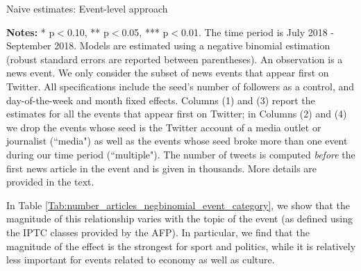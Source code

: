 \begin{table}
\caption{Naive estimates: Event-level approach}
\begin{center}
	
\end{center}
\begin{spacing}{0.5}
	{\fns \textbf{Notes:} * p$<$0.10, ** p$<$0.05, *** p$<$0.01. The time period is July 2018 - September 2018.  Models are estimated using a negative binomial estimation (robust standard errors are reported between parentheses). An observation is a news event. We only consider the subset of news events that appear first on Twitter. All specifications include the seed's number of followers as a control, and day-of-the-week and month fixed effects. Columns (1) and (3) report the estimates for all the events that appear first on Twitter; in Columns (2) and (4) we drop the events whose seed is the Twitter account of a media outlet or journalist (``media") as well as the events whose seed broke more than one event during our time period (``multiple"). The number of tweets is computed \textit{before} the first news article in the event and is given in thousands. More details are provided in the text.} 
\end{spacing}
\label{Tab:number_articles_negbinomial_event}
\end{table} 


In Table \ref{Tab:number_articles_negbinomial_event_category}, we show that the magnitude of this relationship varies with the topic of the event (as defined using the IPTC classes provided by the AFP). In particular, we find that the magnitude of the effect is the strongest for sport and politics, while it is relatively less important for events related to economy as well as culture.


